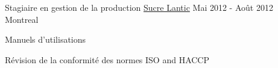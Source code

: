 \begin{cventries}
  \cventry
    {Stagiaire en gestion de la production} %
    {\href{https://www.lanticrogers.com/}{Sucre Lantic}} %
    {Mai 2012 - Août 2012} %
    {Montreal} %
    {
      \begin{cvitems} %
        \item {Manuels d'utilisations}
        \item {Révision de la conformité des normes ISO and HACCP}
      \end{cvitems}
    }

\end{cventries}
